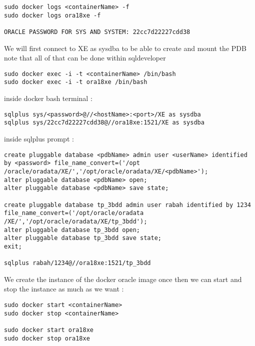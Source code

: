 \documentclass{article}
\begin{document}
\vspace{0.5cm}
\begin{tcolorbox}[title = Fetch Oracle Password]
\begin{verbatim}
sudo docker logs <containerName> -f
sudo docker logs ora18xe -f

ORACLE PASSWORD FOR SYS AND SYSTEM: 22cc7d22227cdd38

\end{verbatim}
\end{tcolorbox}
\vspace{1cm}
\begin{tcolorbox}[title= Connecting As SYSDBA and Creating PDB]
We will first connect to XE as sysdba to be able to create and mount the PDB note that all of that can be done
within sqldeveloper

\vspace{0.15cm}
\begin{verbatim}
sudo docker exec -i -t <containerName> /bin/bash
sudo docker exec -i -t ora18xe /bin/bash
\end{verbatim}
inside docker bash terminal :
\begin{verbatim}
sqlplus sys/<password>@//<hostName>:<port>/XE as sysdba
sqlplus sys/22cc7d22227cdd38@//ora18xe:1521/XE as sysdba
\end{verbatim}
inside sqlplus prompt :
\begin{verbatim}
create pluggable database <pdbName> admin user <userName> identified by <password> file_name_convert=('/opt
/oracle/oradata/XE/','/opt/oracle/oradata/XE/<pdbName>');
alter pluggable database <pdbName> open;
alter pluggable database <pdbName> save state;

create pluggable database tp_3bdd admin user rabah identified by 1234 file_name_convert=('/opt/oracle/oradata
/XE/','/opt/oracle/oradata/XE/tp_3bdd');
alter pluggable database tp_3bdd open;
alter pluggable database tp_3bdd save state;
exit;

sqlplus rabah/1234@//ora18xe:1521/tp_3bdd

\end{verbatim}
\end{tcolorbox}

\vspace{0.5cm}
\begin{tcolorbox}[title = Note]
We create the instance of the docker oracle image once then we can start and stop the instance as much as we want :
\begin{verbatim}
sudo docker start <containerName>
sudo docker stop <containerName>

sudo docker start ora18xe
sudo docker stop ora18xe
\end{verbatim}
\end{tcolorbox}
\end{document}
